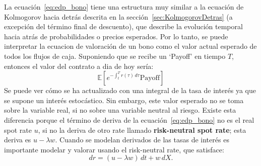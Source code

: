 La ecuación~\eqref{eq:edp_bono} tiene una estructura muy similar a la ecuación de Kolmogorov hacia detrás descrita en la sección~\eqref{sec:KolmogorovDetras} (a excepción del término final de descuento), que describe la evolución temporal hacia atrás de probabilidades o precios esperados. Por lo tanto, se puede interpretar la ecuacion de valoración de un bono como el valor actual esperado de todos los flujos de caja. Suponiendo que se recibe un `Payoff' en tiempo $T$, entonces el valor del contrato a dia de hoy sería:
\begin{equation*}
    \mathbb{E}\left[ e^{-\int_t^T r(\tau)\,d\tau} \text{Payoff} \right]
\end{equation*}
Se puede ver cómo se ha actualizado con una integral de la tasa de interés ya que se supone un interés estocástico. Sin embargo, este valor esperado no se toma sobre la variable real, si no sobre una variable neutral al riesgo. Existe esta diferencia porque el término de deriva de la ecuación~\eqref{eq:edp_bono} no es el real spot rate $u$, si no la deriva de otro rate llamado \textbf{risk-neutral spot rate}; esta deriva es $u-\lambda w$. Cuando se modelan derivados de las tasas de interés es importante modelar y valorar usando el risk-neutral rate, que satisface:
\begin{equation*}
    dr = (u - \lambda w)\,dt + w\,dX.
\end{equation*}







